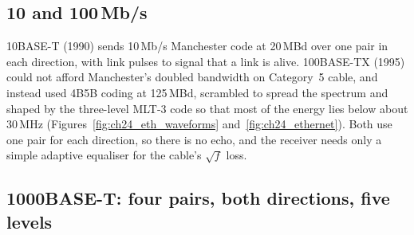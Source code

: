 \subsection{10 and 100\,Mb/s}

10BASE-T (1990) sends 10\,Mb/s Manchester code at 20\,MBd over one pair in each direction, with link
pulses to signal that a link is alive. 100BASE-TX (1995) could not afford Manchester's doubled
bandwidth on Category~5 cable, and instead used 4B5B coding at 125\,MBd, scrambled to spread the
spectrum and shaped by the three-level MLT-3 code so that most of the energy lies below about 30\,MHz
(Figures~\ref{fig:ch24_eth_waveforms} and~\ref{fig:ch24_ethernet}). Both use one pair for each
direction, so there is no echo, and the receiver needs only a simple adaptive equaliser for the
cable's $\sqrt f$ loss.


\subsection{1000BASE-T: four pairs, both directions, five levels}

